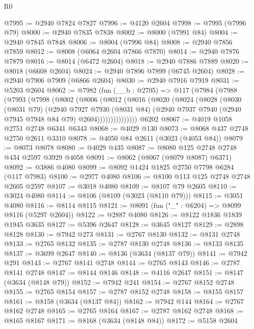 \begin{lexlean}{R0}
\begin{coremodule}
@7995 := @2940 @7824 @7827
@7996 := @4120 @2604
@7998 := @7995 (@7996 @79)
@8000 := @2940 @7835 @7838
@8002 := @8000 (@7991 @84)
@8004 := @2940 @7845 @7848
@8006 := @8004 (@7996 @84)
@8008 := @2940 @7856 @7859
@8012 := @8008 (@6064 @2604 @7866 @7870)
@8014 := @2940 @7876 @7879
@8016 := @8014 (@6472 @2604)
@8018 := @2940 @7886 @7889
@8020 := @8018 (@6608 @2604)
@8024 := @2940 @7896 @7899 (@6745 @2604)
@8028 := @2940 @7906 @7909 (@6866 @2604)
@8030 := @2940 @7916 @7919
@8031 := @5203 @2604
@8062 := @7982
    (fun (__b : @2705) =>
    @117
      (@7984
        (@7988
          (@7993
            (@7998
              (@8002
                (@8006
                  (@8012
                    (@8016
                      (@8020
                        (@8024
                          (@8028
                            (@8030
                              (@8031 @79)
                              (@2940
                                @7927
                                @7930
                                (@8031 @84)
                                (@2940 @7937 @7940 (@2940 @7945 @7948 @84 @79) @2604)))))))))))))))
    @6202
@8067 := @4019 @1058 @2751 @2748 @6341 @6343
@8068 := @4029 @130
@8073 := @8068 @437 @2748 @2750 @2611 @3310
@8078 := @4050 @84 @2611 (@3023 (@4053 @84))
@8079 := @8073 @8078
@8080 := @4029 @435
@8087 := @8080 @125 @2748 @2748 @434 @2597 @3929 @4058
@8091 := @8062 (@8067 (@8079 @8087) @6371)
@8092 := @3886 @4080
@8099 := @8092 @1424 @1825 @2750 @7798 @6284 (@117 @7983)
@8100 := @2977 @4080
@8106 := @8100 @113 @125 @2748 @2748 @2605 @2597
@8107 := @3018 @4080
@8109 := @8107 @79 @2605
@8110 := @3024 @4080
@8114 := @8106 (@8109 (@3023 (@8110 @79)))
@8115 := @3051 @4080
@8116 := @8114 @8115
@8121 := @8091 (fun ("_" : @6204) => @8099 @8116 (@5297 @2604))
@8122 := @2887 @4080
@8126 := @8122 @1836 @1839 @1945 @3635
@8127 := @5396 @2647
@8128 := @3645 @8127
@8129 := @2898 @8128
@8130 := @7942 @273
@8131 := @2767 @8130
@8132 := @8131 @2748
@8133 := @2765 @8132
@8135 := @2787 @8130 @2748
@8136 := @8133 @8135
@8137 := @3699 @2647
@8140 := @8136 (@3634 (@8137 @79))
@8141 := @7942 @291
@8143 := @2767 @8141 @2748
@8144 := @2765 @8143
@8146 := @2787 @8141 @2748
@8147 := @8144 @8146
@8148 := @4116 @2647
@8151 := @8147 (@3634 (@8148 @79))
@8152 := @7942 @241
@8154 := @2767 @8152 @2748
@8155 := @2765 @8154
@8157 := @2787 @8152 @2748
@8158 := @8155 @8157
@8161 := @8158 (@3634 (@8137 @84))
@8162 := @7942 @144
@8164 := @2767 @8162 @2748
@8165 := @2765 @8164
@8167 := @2787 @8162 @2748
@8168 := @8165 @8167
@8171 := @8168 (@3634 (@8148 @84))
@8172 := @5158 @2604

\end{coremodule}
\end{lexlean}
